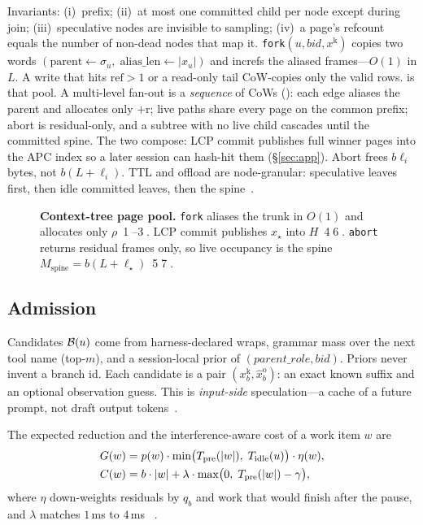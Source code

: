 Invariants: (i)~prefix; (ii)~at most one committed child per node except during join; (iii)~speculative nodes are invisible to sampling; (iv)~a page's refcount equals the number of non-dead nodes that map it.
\texttt{fork}$(u,\mathit{bid},x^{\mathrm{k}})$ copies two words $(\mathrm{parent}\leftarrow\sigma_u,\;\mathrm{alias\_len}\leftarrow|x_u|)$ and increfs the aliased frames---$O(1)$ in $L$.
A write that hits $\mathrm{ref}>1$ or a read-only tail CoW-copies only the valid rows.
 is that pool.
A multi-level fan-out is a \emph{sequence} of CoWs (): each edge aliases the parent and allocates only $+$r; live paths share every page on the common prefix; abort is residual-only, and a subtree with no live child cascades until the committed spine.
The two compose: LCP commit publishes full winner pages into the APC index so a later session can hash-hit them (\S\ref{sec:app}).
Abort frees $b\ell_i$ bytes, not $b(L+\ell_i)$.
TTL and offload are node-granular: speculative leaves first, then idle committed leaves, then the spine~\cite{continuum,mori}.

\begin{figure}[t]
\centering
\resizebox{\textwidth}{!}{}
\caption{\textbf{Context-tree page pool.}
\texttt{fork} aliases the trunk in $O(1)$ and allocates only $\rho$~\textcircled{1}--\textcircled{3}.
LCP commit publishes $x_\star$ into $H$~\textcircled{4}\textcircled{6}.
\texttt{abort} returns residual frames only, so live occupancy is the spine $M_{\mathrm{spine}}{=}b(L{+}\ell_\star)$~\textcircled{5}\textcircled{7}.}
\label{fig:pool}
\end{figure}

\subsection{Admission}
\label{sec:speculate}
Candidates $\mathcal{B}(u)$ come from harness-declared wraps, grammar mass over the next tool name (top-$m$), and a session-local prior of $(\mathit{parent\_role},\mathit{bid})$.
Priors never invent a branch id.
Each candidate is a pair $(x^{\mathrm{k}}_b,\hat{x}^{\mathrm{o}}_b)$: an exact known suffix and an optional observation guess.
This is \emph{input-side} speculation---a cache of a future prompt, not draft output tokens~\cite{speculative,medusa}.

The expected \ttft{} reduction and the interference-aware cost of a work item $w$ are
\begin{align}
G(w) &= p(w)\cdot\min\bigl(T_{\mathrm{pre}}(|w|),\;T_{\mathrm{idle}}(u)\bigr)\cdot\eta(w), \label{eq:gain}\\
C(w) &= b\cdot|w|+\lambda\cdot\max\bigl(0,\;T_{\mathrm{pre}}(|w|)-\gamma\bigr), \label{eq:cost}
\end{align}
where $\eta$ down-weights residuals by $q_b$ and work that would finish after the pause, and $\lambda$ matches $1$\,ms \tbt{} to $4$\,ms \ttft{}~\cite{jitserve}.

